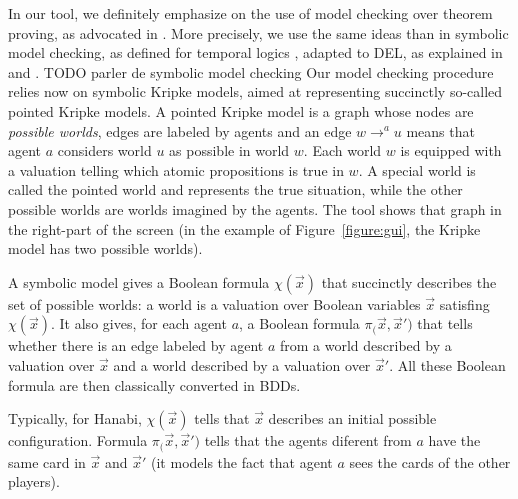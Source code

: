 In our tool, we definitely emphasize on the use of model checking over theorem proving, as advocated in \cite{DBLP:conf/kr/HalpernV91}. More precisely, we use the same ideas than in symbolic model checking, as defined for temporal logics \cite{DBLP:conf/lics/BurchCMDH90}, adapted to DEL, as explained in \cite{DBLP:conf/atal/CharrierS17} and \cite{DBLP:conf/aiml/CharrierS18}. TODO parler de symbolic model checking Our model checking procedure relies now on symbolic Kripke models, aimed at representing succinctly so-called pointed Kripke models. A pointed Kripke model is a graph whose nodes are \emph{possible worlds}, edges are labeled by agents and an edge $w \rightarrow^a u$ means that agent $a$ considers world $u$ as possible in world $w$. Each world $w$ is equipped with a valuation telling which atomic propositions is true in $w$. A special world is called the pointed world and represents the true situation, while the other possible worlds are worlds imagined by the agents.
The tool shows that graph in the right-part of the screen (in the example of Figure~\ref{figure:gui}, the Kripke model has two possible worlds). 


\newcommand{\succinctsetworlds}{\chi}
\newcommand{\succinctrelation}[1]{\pi_{#1}}
 A symbolic model gives a Boolean formula $\succinctsetworlds(\vec x)$ that succinctly  describes the set of possible worlds: a world is a valuation over Boolean variables $\vec x$ satisfing $\succinctsetworlds(\vec x)$. It also gives, for each agent $a$, a Boolean formula $\succinctrelation(\vec x, \vec x')$ that tells whether there is an edge labeled by agent $a$ from a world described by a valuation over $\vec x$ and  a world described by a valuation over $\vec x'$. All these Boolean formula are then classically converted in BDDs.%


Typically, for Hanabi, $\succinctsetworlds(\vec x)$ tells that $\vec x$ describes an initial possible configuration. Formula $\succinctrelation(\vec x, \vec x')$ tells that the agents diferent from $a$ have the same card in $\vec x$ and $\vec x'$ (it models the fact that agent $a$ sees the cards of the other players).

